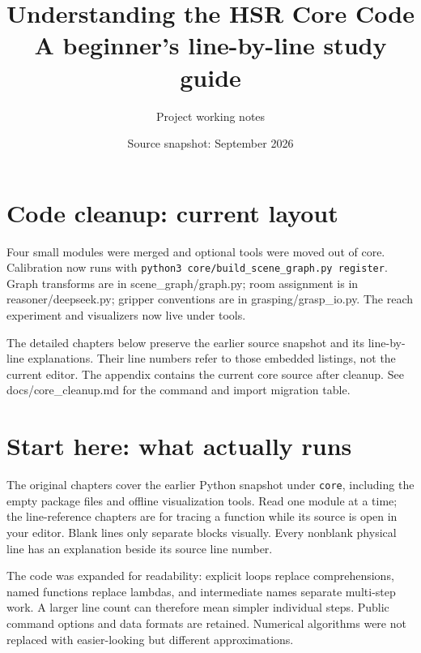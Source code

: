 \documentclass[11pt,a4paper]{book}
\title{Understanding the HSR Core Code\\A beginner's line-by-line study guide}
\author{Project working notes}
\date{Source snapshot: September 2026}
\begin{document}
\maketitle
\tableofcontents
\chapter*{Code cleanup: current layout}
Four small modules were merged and optional tools were moved out of core.
Calibration now runs with \texttt{python3 core/build\_scene\_graph.py register}.
Graph transforms are in scene\_graph/graph.py; room assignment is in
reasoner/deepseek.py; gripper conventions are in grasping/grasp\_io.py.
The reach experiment and visualizers now live under tools.

The detailed chapters below preserve the earlier source snapshot and its
line-by-line explanations. Their line numbers refer to those embedded listings,
not the current editor. The appendix contains the current core source after
cleanup. See docs/core\_cleanup.md for the command and import migration table.

\chapter{Start here: what actually runs}
The original chapters cover the earlier Python snapshot under \texttt{core},
including the empty package files and offline visualization tools. Read one module
at a time; the line-reference chapters are for tracing a function while its source
is open in your editor. Blank lines only separate blocks visually. Every nonblank
physical line has an explanation beside its source line number.

The code was expanded for readability: explicit loops replace comprehensions,
named functions replace lambdas, and intermediate names separate multi-step work.
A larger line count can therefore mean simpler individual steps. Public command
options and data formats are retained. Numerical algorithms were not replaced
with easier-looking but different approximations.
\end{document}
